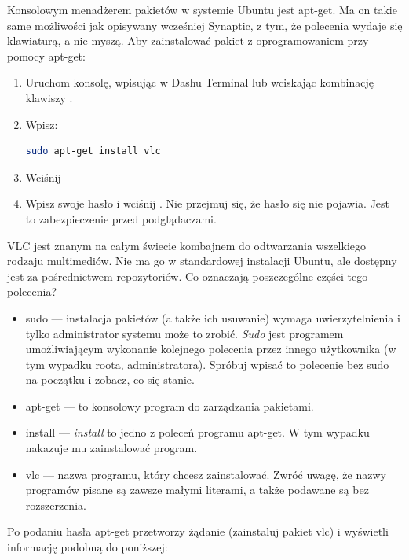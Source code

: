 Konsolowym menadżerem pakietów w systemie Ubuntu jest \textcolor{ubuntu_orange}{apt-get}. Ma on takie same możliwości jak opisywany wcześniej Synaptic, z tym, że polecenia wydaje się klawiaturą, a nie myszą. Aby zainstalować pakiet z oprogramowaniem przy pomocy apt-get:
\begin{enumerate}
\item Uruchom konsolę, wpisując w Dashu \textcolor{ubuntu_orange}{Terminal} lub wciskając kombinację klawiszy .
\item Wpisz:
\begin{lstlisting}[language=bash]
sudo apt-get install vlc
\end{lstlisting}
\item Wciśnij \keys{\returnwin}
\item Wpisz swoje hasło i wciśnij \keys{\returnwin}. Nie przejmuj się, że hasło się nie pojawia. Jest to zabezpieczenie przed podglądaczami.
\end{enumerate}

VLC jest znanym na całym świecie kombajnem do odtwarzania wszelkiego rodzaju multimediów. Nie ma go w standardowej instalacji Ubuntu, ale dostępny jest za pośrednictwem repozytoriów. Co oznaczają poszczególne części tego polecenia?

\begin{itemize}
\item \textcolor{ubuntu_orange}{sudo} --- instalacja pakietów (a także ich usuwanie) wymaga uwierzytelnienia i tylko administrator systemu może to zrobić. \textit{Sudo} jest programem umożliwiającym wykonanie kolejnego polecenia przez innego użytkownika (w tym wypadku roota, administratora). Spróbuj wpisać to polecenie bez sudo na początku i zobacz, co się stanie.
\item \textcolor{ubuntu_orange}{apt-get} --- to konsolowy program do zarządzania pakietami.
\item \textcolor{ubuntu_orange}{install} --- \textit{install} to jedno z poleceń programu apt-get. W tym wypadku nakazuje mu zainstalować program.
\item \textcolor{ubuntu_orange}{vlc} --- nazwa programu, który chcesz zainstalować. Zwróć uwagę, że nazwy programów pisane są zawsze małymi literami, a także podawane są bez rozszerzenia.
\end{itemize}

Po podaniu hasła apt-get przetworzy żądanie (zainstaluj pakiet vlc) i wyświetli informację podobną do poniższej:

